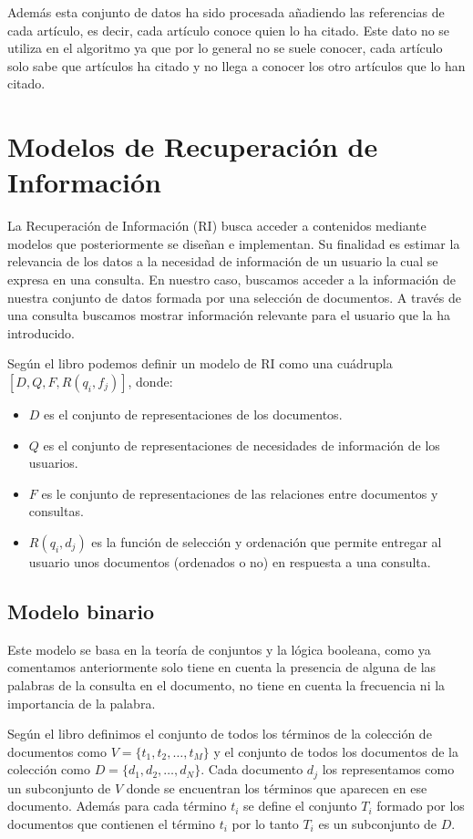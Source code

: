 \documentclass[size=a4, parskip=half, titlepage=false, toc=flat, toc=bib, 12pt]{scrartcl}
\theoremstyle{theorem-style}
\theoremstyle{definition-style}
\theoremstyle{remark-style}
\theoremstyle{example-style}
\theoremstyle{definition-style}
\theoremstyle{remark-style}
\begin{document}
Además esta conjunto de datos ha sido procesada añadiendo las referencias de cada artículo, es decir, cada artículo conoce quien lo ha citado. Este dato no se utiliza en el algoritmo ya que por lo general no se suele conocer, cada artículo solo sabe que artículos ha citado y no llega a conocer los otro artículos que lo han citado.

\newpage

\section{Modelos de Recuperación de Información}
La Recuperación de Información (RI) busca acceder a contenidos mediante modelos que posteriormente se diseñan e implementan. Su finalidad es estimar la relevancia de los datos a la necesidad de información de un usuario la cual se expresa en una consulta.
En nuestro caso, buscamos acceder a la información de nuestra conjunto de datos formada por una selección de documentos. A través de una consulta buscamos mostrar información relevante para el usuario que la ha introducido.

Según el libro \cite{ri} podemos definir un modelo de RI como una cuádrupla $[D,Q,F,R(q_i,f_j)]$, donde:
\begin{itemize}
\item $D$ es el conjunto de representaciones de los documentos.
\item $Q$ es el conjunto de representaciones de necesidades de información de los usuarios.
\item $F$ es le conjunto de representaciones de las relaciones entre documentos y consultas.
\item $R(q_i,d_j)$ es la función de selección y ordenación que permite entregar al usuario unos documentos (ordenados o no) en respuesta a una consulta.
\end{itemize}

\subsection{Modelo binario}
Este modelo se basa en la teoría de conjuntos y la lógica booleana, como ya comentamos anteriormente solo tiene en cuenta la presencia de alguna de las palabras de la consulta en el documento, no tiene en cuenta la frecuencia ni la importancia de la palabra.

Según el libro \cite{ri} definimos el conjunto de todos los términos de la colección de documentos como $V = \{t_1, t_2, \dots, t_M \}$ y el conjunto de todos los documentos de la colección como $D = \{ d_1, d_2, \dots, d_N \}$. Cada documento $d_j$ los representamos como un subconjunto de $V$ donde se encuentran los términos que aparecen en ese documento. Además para cada término $t_i$ se define el conjunto $T_i$ formado por los documentos que contienen el término $t_i$ por lo tanto $T_i$ es un subconjunto de $D$.
\end{document}

